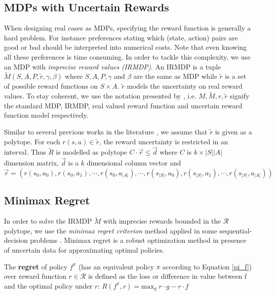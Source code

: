 \documentclass[runningheads,a4paper]{llncs}
\begin{document}
\subsection{MDPs with Uncertain Rewards}
When designing real cases as MDPs, specifying the reward function is generally a hard problem. For instance preferences stating which (state, action) pairs are good or bad should be interpreted into numerical costs. Note that even knowing all these preferences is time consuming. In order to
tackle this complexity, we use an MDP with \textit{imprecise reward values (IRMDP)}. An IRMDP \citep{Regan2009} is a tuple $\tilde{M}(S, A, P, \tilde{r}, \gamma, \beta)$ where $S, A, P, \gamma$ and $\beta$ are the same as MDP while $\tilde{r}$ is a set of possible reward functions on $S \times A$. $\tilde{r}$ models the uncertainty on real reward values. To stay coherent, we use the notation presented by , i.e. $M, \tilde{M}, r, \tilde{r}$ signify the standard MDP, IRMDP, real valued reward function and uncertain reward function model respectively.  

Similar to several previous works in the literature \cite{Ahmed2017,alizadeh2015,benavent2018,Regan2009,Weng2013}, we assume that $\tilde{r}$ is given as a polytope. For each $r(s,a) \in \tilde{r}$, the reward uncertainty is restricted in an interval. Thus $\tilde{R}$ is modelled as polytope $C \cdot \overrightarrow{r} \leq \overrightarrow{d}$ where $C$ is $k \times |S||A|$ dimension matrix, $\overrightarrow{d}$ is a $k$ dimensional column vector and $\overrightarrow{r} = (r(s_0,a_0), r(s_0,a_1), \cdots, r(s_0,a_{|A|}), \cdots, r( s_{|S|},a_0), r(s_{|S|},a_1), \cdots, r(s_{|S|},a_{|A|}) )$
 

\subsection{Minimax Regret}\label{sec:minimax-regret}
In order to solve the IRMDP $\tilde{M}$ with imprecise rewards bounded in the $\mathcal{R}$ polytope, we use the \textit{minimax regret criterion} method applied in some sequential-decision problems \cite{Regan2009,Xu2009}. Minimax regret is a robust optimization method in presence of uncertain data for approximating optimal policies. 

\begin{definition}
The \textbf{regret} of policy $f^{\pi}$ (has an equivalent policy $\pi$ according to Equation \ref{pi_f}) over reward function $r \in \mathcal{R}$ is defined as the loss or difference in value between f and the optimal policy under $r$: $R(f^{\pi}, r) = \text{max}_{g} \; r \cdot g - r \cdot f$
\end{definition}
\end{document}
